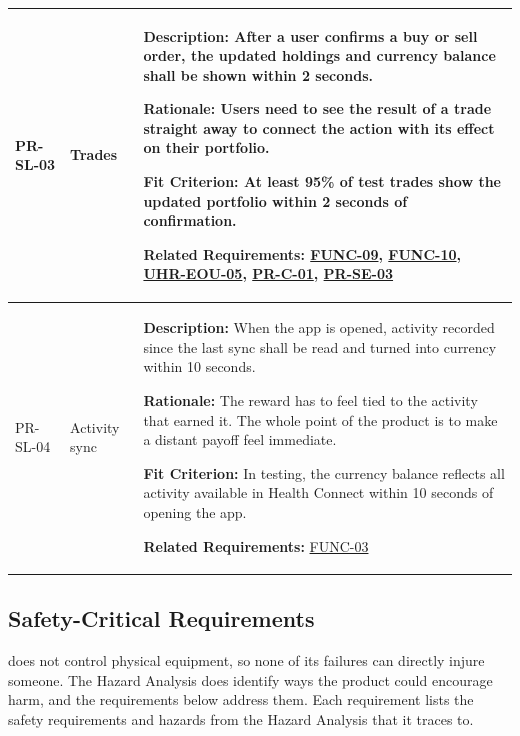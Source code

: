 \documentclass[12pt]{article}
\begin{document}
\begin{xltabular}{\textwidth}{|p{2.6cm}|p{3.4cm}|X|}
PR-SL-03\hypertarget{req:PR-SL-03}{} &
Trades &
\textbf{Description:} After a user confirms a buy or sell order, the updated holdings and currency balance shall be shown within 2 seconds.

\textbf{Rationale:} Users need to see the result of a trade straight away to connect the action with its effect on their portfolio.

\textbf{Fit Criterion:} At least 95\% of test trades show the updated portfolio within 2 seconds of confirmation.

\textbf{Related Requirements:} \hyperlink{req:FUNC-09}{FUNC-09}, \hyperlink{req:FUNC-10}{FUNC-10}, \hyperlink{req:UHR-EOU-05}{UHR-EOU-05}, \hyperlink{req:PR-C-01}{PR-C-01}, \hyperlink{req:PR-SE-03}{PR-SE-03}\\
\hline

PR-SL-04\hypertarget{req:PR-SL-04}{} &
Activity sync &
\textbf{Description:} When the app is opened, activity recorded since the last sync shall be read and turned into currency within 10 seconds.

\textbf{Rationale:} The reward has to feel tied to the activity that earned it. The whole point of the product is to make a distant payoff feel immediate.

\textbf{Fit Criterion:} In testing, the currency balance reflects all activity available in Health Connect within 10 seconds of opening the app.

\textbf{Related Requirements:} \hyperlink{req:FUNC-03}{FUNC-03}\\
\hline

\end{xltabular}

\subsection{Safety-Critical Requirements}

\progname{} does not control physical equipment, so none of its failures can
directly injure someone. The Hazard Analysis does identify ways the product
could encourage harm, and the requirements below address them. Each
requirement lists the safety requirements and hazards from the Hazard Analysis
that it traces to.
\end{document}
